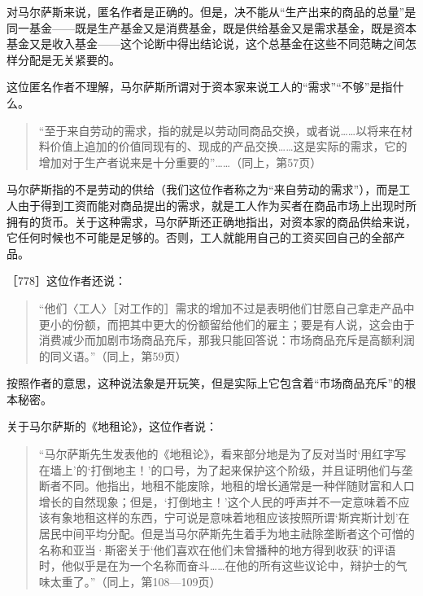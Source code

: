 对马尔萨斯来说，匿名作者是正确的。但是，决不能从“生产出来的商品的总量”是同一基金——既是生产基金又是消费基金，既是供给基金又是需求基金，既是资本基金又是收入基金——这个论断中得出结论说，这个总基金在这些不同范畴之间怎样分配是无关紧要的。

这位匿名作者不理解，马尔萨斯所谓对于资本家来说工人的“需求”“不够”是指什么。

\begin{quote}{“至于来自劳动的需求，指的就是以劳动同商品交换，或者说……以将来在材料价值上追加的价值同现有的、现成的产品交换……这是实际的需求，它的增加对于生产者说来是十分重要的”……（同上，第57页）}\end{quote}

马尔萨斯指的不是劳动的供给（我们这位作者称之为“来自劳动的需求”），而是工人由于得到工资而能对商品提出的需求，就是工人作为买者在商品市场上出现时所拥有的货币。关于这种需求，马尔萨斯还正确地指出，对资本家的商品供给来说，它任何时候也不可能是足够的。否则，工人就能用自己的工资买回自己的全部产品。

［778］这位作者还说：

\begin{quote}{“他们〈工人〉［对工作的］需求的增加不过是表明他们甘愿自己拿走产品中更小的份额，而把其中更大的份额留给他们的雇主；要是有人说，这会由于消费减少而加剧市场商品充斥，那我只能回答说：市场商品充斥是高额利润的同义语。”（同上，第59页）}\end{quote}

按照作者的意思，这种说法象是开玩笑，但是实际上它包含着“市场商品充斥”的根本秘密。

关于马尔萨斯的《地租论》，这位作者说：

\begin{quote}{“马尔萨斯先生发表他的《地租论》，看来部分地是为了反对当时‘用红字写在墙上’的‘打倒地主！’的口号，为了起来保护这个阶级，并且证明他们与垄断者不同。他指出，地租不能废除，地租的增长通常是一种伴随财富和人口增长的自然现象；但是，‘打倒地主！’这个人民的呼声并不一定意味着不应该有象地租这样的东西，宁可说是意味着地租应该按照所谓‘斯宾斯计划’在居民中间平均分配。但是当马尔萨斯先生着手为地主祛除垄断者这个可憎的名称和亚当·斯密关于‘他们喜欢在他们未曾播种的地方得到收获’的评语时，他似乎是在为一个名称而奋斗……在他的所有这些议论中，辩护士的气味太重了。”（同上，第108—109页）}\end{quote}

